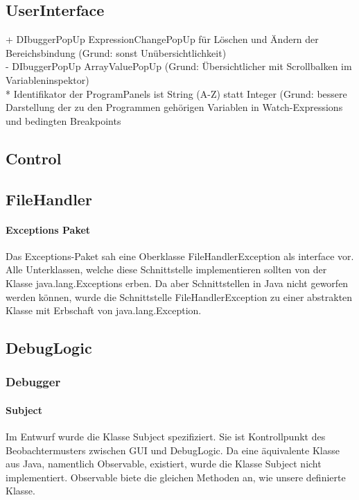 \documentclass[parskip=full]{scrartcl}
\begin{document}
\subsection{UserInterface}
+ DIbuggerPopUp ExpressionChangePopUp für Löschen und Ändern der Bereichsbindung (Grund: sonst Unübersichtlichkeit) \\
- DIbuggerPopUp ArrayValuePopUp (Grund: Übersichtlicher mit Scrollbalken im Variableninspektor) \\
* Identifikator der ProgramPanels ist String (A-Z) statt Integer (Grund: bessere Darstellung der zu den Programmen gehörigen Variablen in Watch-Expressions und bedingten Breakpoints
\subsection{Control}
\subsection{FileHandler}
\paragraph{Exceptions Paket}
Das Exceptions-Paket sah eine Oberklasse FileHandlerException als interface vor.
Alle Unterklassen, welche diese Schnittstelle implementieren sollten von der Klasse java.lang.Exceptions erben. Da aber Schnittstellen in Java nicht geworfen werden können, wurde die Schnittstelle FileHandlerException zu einer abstrakten Klasse mit Erbschaft von java.lang.Exception.
\subsection{DebugLogic}
\subsubsection{Debugger}
\paragraph{Subject}
Im Entwurf wurde die Klasse Subject spezifiziert. Sie ist Kontrollpunkt des Beobachtermusters zwischen GUI und DebugLogic. Da eine äquivalente Klasse aus Java, namentlich Observable, existiert, wurde die Klasse Subject nicht implementiert.
Observable biete die gleichen Methoden an, wie unsere definierte Klasse.
\end{document}
